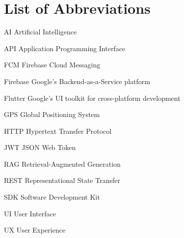 \chapter*{List of Abbreviations}
\begin{abbrv}
    
    \item[AI]                Artificial Intelligence
    \item[API]               Application Programming Interface
    \item[FCM]               Firebase Cloud Messaging
    \item[Firebase]          Google's Backend-as-a-Service platform
    \item[Flutter]           Google's UI toolkit for cross-platform development
    \item[GPS]               Global Positioning System
    \item[HTTP]              Hypertext Transfer Protocol
    \item[JWT]               JSON Web Token
    \item[RAG]               Retrieval-Augmented Generation
    \item[REST]              Representational State Transfer
    \item[SDK]               Software Development Kit
    \item[UI]                User Interface
    \item[UX]                User Experience
    
\end{abbrv}
